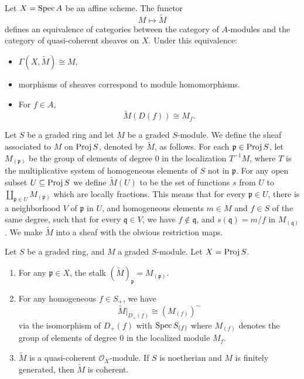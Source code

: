 \documentclass[12pt]{article}
\begin{document}
\begin{theorem}
    Let $X=\operatorname{Spec} A$ be an affine scheme. The functor
    \[
        M \longmapsto \widetilde{M}
    \]
    defines an equivalence of categories between the category of $A$-modules and the category of quasi-coherent sheaves on $X$. Under this equivalence:
    \begin{itemize}
        \item $\Gamma(X,\widetilde{M}) \cong M$,
        \item morphisms of sheaves correspond to module homomorphisms.
        \item
              For $f\in A$,
              \[
                  \widetilde{M}(D(f)) \cong M_f.
              \]
    \end{itemize}
\end{theorem}

\begin{definition}
    Let $S$ be a graded ring and let $M$ be a graded $S$-module. We define the sheaf associated to $M$ on $\operatorname{Proj} S$, denoted by $\widetilde{M}$, as follows. For each $\mathfrak p \in \operatorname{Proj} S$, let $M_{(\mathfrak p)}$ be the group of elements of degree $0$ in the localization $T^{-1}M$, where $T$ is the multiplicative system of homogeneous elements of $S$ not in $\mathfrak p$. For any open subset $U \subseteq \operatorname{Proj} S$ we define $\widetilde{M}(U)$ to be the set of functions $s$ from $U$ to $\coprod_{\mathfrak p \in U} M_{(\mathfrak p)}$ which are locally fractions. This means that for every $\mathfrak p \in U$, there is a neighborhood $V$ of $\mathfrak p$ in $U$, and homogeneous elements $m \in M$ and $f \in S$ of the same degree, such that for every $\mathfrak q \in V$, we have $f \notin \mathfrak q$, and $s(\mathfrak q) = m/f$ in $M_{(\mathfrak q)}$. We make $\widetilde{M}$ into a sheaf with the obvious restriction maps.
\end{definition}

\begin{proposition}
    Let $S$ be a graded ring, and $M$ a graded $S$-module. Let $X = \operatorname{Proj} S$.
    \begin{enumerate}
        \item[(a)] For any $\mathfrak p \in X$, the stalk $(\widetilde{M})_{\mathfrak p} = M_{(\mathfrak p)}$.
        \item[(b)] For any homogeneous $f \in S_+$, we have
              \[
                  \widetilde{M}|_{D_+(f)} \cong (M_{(f)})^\sim
              \]
              via the isomorphism of $D_+(f)$ with $\operatorname{Spec} S_{(f)}$ where $M_{(f)}$ denotes the group of elements of degree $0$ in the localized module $M_f$.
        \item[(c)] $\widetilde{M}$ is a quasi-coherent $\mathcal O_X$-module. If $S$ is noetherian and $M$ is finitely generated, then $\widetilde{M}$ is coherent.
    \end{enumerate}
\end{proposition}
\end{document}
